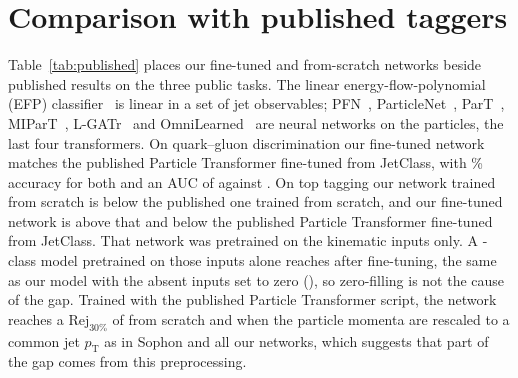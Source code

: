 \section{Comparison with published taggers}\label{app:published}

Table~\ref{tab:published} places our fine-tuned and from-scratch networks beside published results on the three
public tasks.
The linear energy-flow-polynomial (EFP) classifier~\cite{efp} is linear in a set of jet observables; PFN~\cite{efn},
ParticleNet~\cite{particlenet}, ParT~\cite{part}, MIParT~\cite{mipart}, L-GATr~\cite{lgatr} and
OmniLearned~\cite{omnilearned} are neural networks on the particles, the last four transformers.
On quark--gluon discrimination our fine-tuned network matches the published Particle Transformer fine-tuned from
JetClass, with \VPubQgAccOurs\% accuracy for both and an AUC of \VPubQgAucOurs{} against \VPubQgAucPart.
On top tagging our network trained from scratch is below the published one trained from scratch, and our fine-tuned
network is above that and below the published Particle Transformer fine-tuned from JetClass.
That network was pretrained on the kinematic inputs only.
A \Kfull-class model pretrained on those inputs alone reaches \VPubTopRejKin{} after fine-tuning, the same as our model
with the absent inputs set to zero (\VPubTopRejOurs), so zero-filling is not the cause of the gap.
Trained with the published Particle Transformer script, the network reaches a $\mathrm{Rej}_{30\%}$ of
\MlstPartreproRthirtyPart{} from scratch and \MlstPartreproRthirtyRescale{} when the particle momenta are rescaled to a
common jet $p_{\mathrm T}$ as in Sophon and all our networks, which suggests that part of the gap comes from this
preprocessing.


